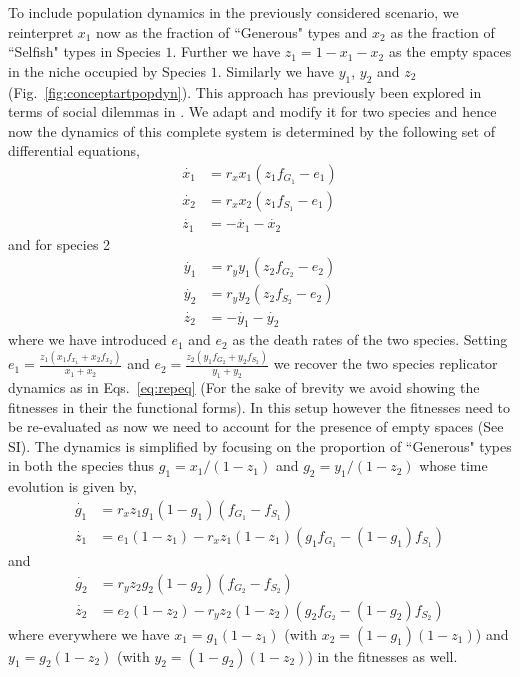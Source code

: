 \documentclass[12pt]{article}
\begin{document}
To include population dynamics in the previously considered scenario, we reinterpret $x_1$ now as the fraction of ``Generous" types and $x_2
$ as the fraction of ``Selfish" types in Species $1$.
Further we have $z_1 = 1 - x_1 - x_2$ as the empty spaces in the niche occupied by Species $1$. 
Similarly we have $y_1$, $y_2$ and $z_2$ (Fig.~\ref{fig:conceptartpopdyn}).
This approach has previously been explored in terms of social dilemmas in \citep{hauert:PRSB:2006}.
We adapt and modify it for two species and hence now the dynamics of this complete system is determined by the following set of differential equations,
%
\begin{align}
	\dot{x_1} &= r_x x_1 (z_1 f_{G_1} - e_1) \nonumber \\
	\dot{x_2} &= r_x x_2 (z_1 f_{S_1} - e_1) \\
	\dot{z_1} &= - \dot{x_1} - \dot{x_2} \nonumber
\end{align}
%
and for species 2
\begin{align}
	\dot{y_1} &= r_y y_1 (z_2 f_{G_2} - e_2) \nonumber \\
	\dot{y_2} &= r_y y_2 (z_2 f_{S_2} - e_2) \\
	\dot{z_2} &= - \dot{y_1} - \dot{y_2} \nonumber
\end{align}
%
where we have introduced $e_1$ and $e_2$ as the death rates of the two species.
Setting $e_1 = \frac{z_1 (x_1 f_{x_1} + x_2 f_{x_2}) }{x_1 + x_2}$ and $e_2 = \frac{z_2 (y_1 f_{G_2} + y_2 f_{S_2}) }{y_1 + y_2}$ we recover the two species replicator dynamics as in Eqs.~\ref{eq:repeq} (For the sake of brevity we avoid showing the fitnesses in their the functional forms).
In this setup however the fitnesses need to be re-evaluated as now we need to account for the presence of empty spaces (See SI).
The dynamics is simplified by focusing on the proportion of ``Generous" types in both the species thus $g_1 = x_1/(1-z_1)$ and $g_2 = y_1/(1-z_2)$ whose time evolution is given by,
\begin{align}
	\dot{g_1} &= r_x z_1 g_1 (1-g_1) (f_{G_1} - f_{S_1}) \nonumber \\
	\dot{z_1} &= e_1 (1-z_1) - r_x z_1 (1-z_1) (g_1 f_{G_1} -  (1-g_1) f_{S_1})
\end{align}
and
\begin{align}
	\dot{g_2} &= r_y z_2 g_2 (1-g_2) (f_{G_2} - f_{S_2}) \nonumber \\
	\dot{z_2} &= e_2 (1-z_2) - r_y z_2 (1-z_2) (g_2 f_{G_2} -  (1-g_2) f_{S_2})
\end{align}
%
where everywhere we have $x_1 = g_1 (1-z_1)$ (with $x_2 = (1-g_1) (1-z_1)$) and $y_1 = g_2 (1-z_2)$ (with $y_2 = (1-g_2) (1-z_2)$) in the fitnesses as well.
\end{document}
